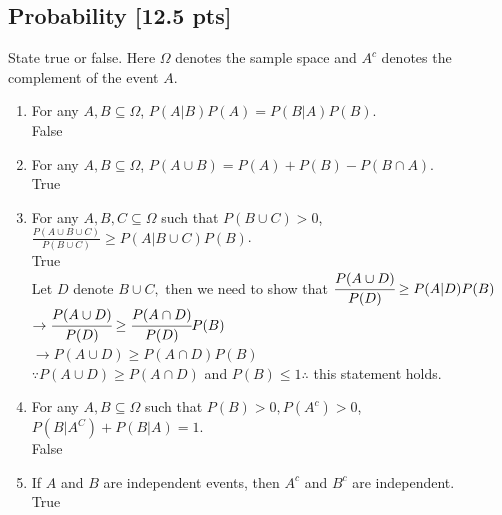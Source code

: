 \documentclass[a4paper]{article}
\theoremstyle{definition}
\newenvironment{soln}{
	\leavevmode\color{blue}\ignorespaces
}{}
\begin{document}
	\subsection{Probability [12.5 pts]}
	State true or false. Here $\Omega$ denotes the sample space and $A^c$ denotes the complement of the event $A$.
	\begin{enumerate}
		\item For any $A, B \subseteq \Omega$, $P(A|B)P(A) = P(B|A)P(B)$.\\
		\begin{soln}  False \end{soln}
		
		\item For any $A, B \subseteq \Omega$, $P(A \cup B) = P(A) + P(B) - P(B \cap A)$.\\         
		\begin{soln}  True \end{soln}
		
		\item For any $A, B, C \subseteq \Omega$ such that $P(B \cup C) > 0$,
		$\frac{P(A \cup B \cup C)}{P(B \cup C)} \geq P(A | B \cup C) P(B)$.\\ 
		\begin{soln} True \\ Let $ D $ denote $ B \cup C, $ then we need to show that $ \cfrac{P(A \cup D)}{P(D)} \geq P(A|D)P(B) $ \\ $ \rightarrow \cfrac{P(A \cup D)}{P(D)} \geq \cfrac{P(A \cap D)}{P(D)}P(B) $ \\ $ \rightarrow P(A \cup D) \geq P(A \cap D)P(B) $ \\ $ \because P(A \cup D) \geq P(A \cap D) $ and $ P(B) \leq 1 \therefore $ this statement holds. \end{soln}
		
		\item For any $A, B\subseteq\Omega$ such that $P(B) > 0, P(A^c) > 0$,
		$P(B|A^C) + P(B|A) = 1$.\\ 
		\begin{soln} False \end{soln}
		
		\item If $A$ and $B$ are independent events, then $A^{c}$ and $B^{c}$ are independent.\\
		\begin{soln} True \end{soln}
		
	\end{enumerate}
	
\end{document}
